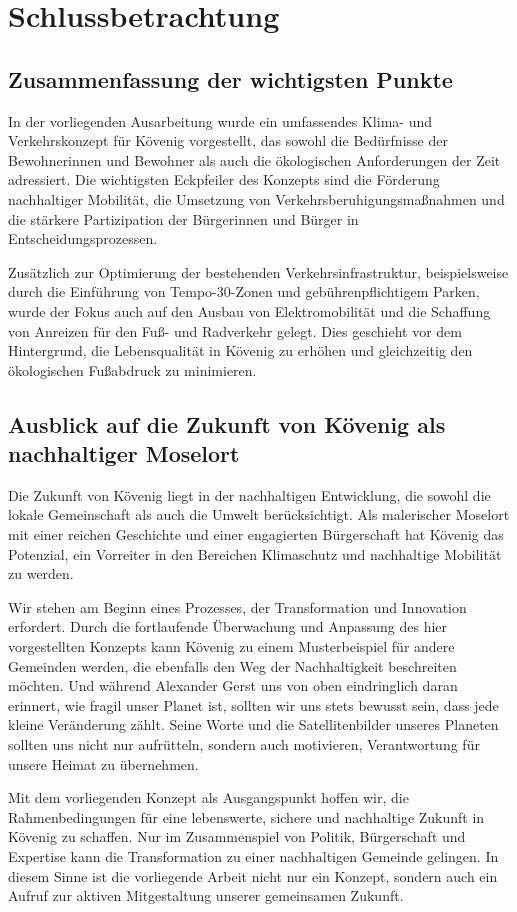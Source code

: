 \section{Schlussbetrachtung}
\subsection{Zusammenfassung der wichtigsten Punkte}

In der vorliegenden Ausarbeitung wurde ein umfassendes Klima- und Verkehrskonzept für Kövenig vorgestellt, das sowohl die Bedürfnisse der Bewohnerinnen und Bewohner als auch die ökologischen Anforderungen der Zeit adressiert. Die wichtigsten Eckpfeiler des Konzepts sind die Förderung nachhaltiger Mobilität, die Umsetzung von Verkehrsberuhigungsmaßnahmen und die stärkere Partizipation der Bürgerinnen und Bürger in Entscheidungsprozessen. 

Zusätzlich zur Optimierung der bestehenden Verkehrsinfrastruktur, beispielsweise durch die Einführung von Tempo-30-Zonen und gebührenpflichtigem Parken, wurde der Fokus auch auf den Ausbau von Elektromobilität und die Schaffung von Anreizen für den Fuß- und Radverkehr gelegt. Dies geschieht vor dem Hintergrund, die Lebensqualität in Kövenig zu erhöhen und gleichzeitig den ökologischen Fußabdruck zu minimieren.

\subsection{Ausblick auf die Zukunft von Kövenig als nachhaltiger Moselort}

Die Zukunft von Kövenig liegt in der nachhaltigen Entwicklung, die sowohl die lokale Gemeinschaft als auch die Umwelt berücksichtigt. Als malerischer Moselort mit einer reichen Geschichte und einer engagierten Bürgerschaft hat Kövenig das Potenzial, ein Vorreiter in den Bereichen Klimaschutz und nachhaltige Mobilität zu werden. 

Wir stehen am Beginn eines Prozesses, der Transformation und Innovation erfordert. Durch die fortlaufende Überwachung und Anpassung des hier vorgestellten Konzepts kann Kövenig zu einem Musterbeispiel für andere Gemeinden werden, die ebenfalls den Weg der Nachhaltigkeit beschreiten möchten. Und während Alexander Gerst uns von oben eindringlich daran erinnert, wie fragil unser Planet ist, sollten wir uns stets bewusst sein, dass jede kleine Veränderung zählt. Seine Worte und die Satellitenbilder unseres Planeten sollten uns nicht nur aufrütteln, sondern auch motivieren, Verantwortung für unsere Heimat zu übernehmen.

Mit dem vorliegenden Konzept als Ausgangspunkt hoffen wir, die Rahmenbedingungen für eine lebenswerte, sichere und nachhaltige Zukunft in Kövenig zu schaffen. Nur im Zusammenspiel von Politik, Bürgerschaft und Expertise kann die Transformation zu einer nachhaltigen Gemeinde gelingen. In diesem Sinne ist die vorliegende Arbeit nicht nur ein Konzept, sondern auch ein Aufruf zur aktiven Mitgestaltung unserer gemeinsamen Zukunft.